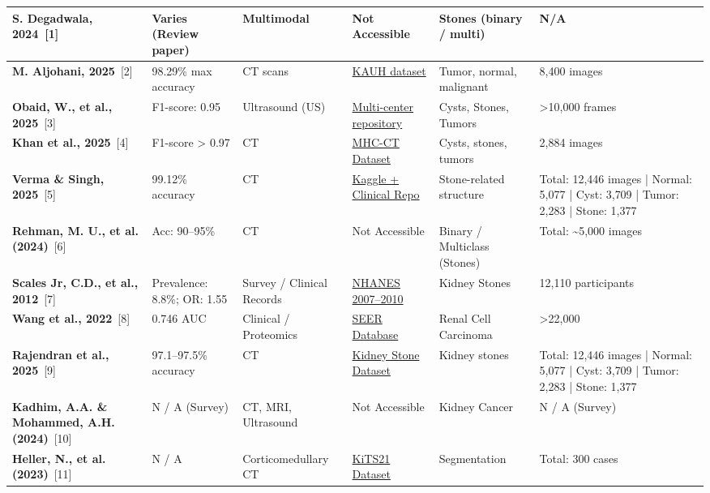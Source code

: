 \documentclass{article}
\begin{document}
\begin{longtable}{|L{2.8cm}|L{2.5cm}|L{1.5cm}|L{3.5cm}|L{3.5cm}|L{4.5cm}|}
\textbf{S. Degadwala, 2024}~[1] & Varies (Review paper) & Multimodal & Not Accessible & Stones (binary / multi) & N/A \\
\hline
\textbf{M. Aljohani, 2025}~[2] & 98.29\% max accuracy & CT scans & \href{https://github.com/DaliaAlzubi/KidneyTumor}{KAUH dataset} & Tumor, normal, malignant & 8,400 images \\
\hline
\textbf{Obaid, W., et al., 2025}~[3] & F1-score: 0.95 & Ultrasound (US) & \href{https://universe.roboflow.com/proyecto-1/tesis-iz9ji}{Multi-center repository} & Cysts, Stones, Tumors & >10,000 frames \\
\hline
\textbf{Khan et al., 2025}~[4] & F1-score > 0.97 & CT & \href{https://www.kaggle.com/datasets/nazmul0087/ct-kidney-dataset-normal-cyst-tumor-and-stone}{MHC-CT Dataset} & Cysts, stones, tumors & 2,884 images \\
\hline
\textbf{Verma \& Singh, 2025}~[5] & 99.12\% accuracy & CT & \href{https://github.com/VS-EYE/KidneyDiseaseDetection}{Kaggle + Clinical Repo} & Stone-related structure & Total: 12,446 images | Normal: 5,077 | Cyst: 3,709 | Tumor: 2,283 | Stone: 1,377 \\
\hline
\textbf{Rehman, M. U., et al. (2024)}~[6] & Acc: 90–95\% & CT & Not Accessible & Binary / Multiclass (Stones) & Total: \textasciitilde{}5,000 images \\
\hline
\textbf{Scales Jr, C.D., et al., 2012}~[7] & Prevalence: 8.8\%; OR: 1.55 & Survey / Clinical Records & \href{https://www.cdc.gov/nchs/nhanes/index.htm}{NHANES 2007–2010} & Kidney Stones & 12,110 participants \\
\hline
\textbf{Wang et al., 2022}~[8] & 0.746 AUC & Clinical / Proteomics & \href{https://seer.cancer.gov/}{SEER Database} & Renal Cell Carcinoma & >22,000 \\
\hline
\textbf{Rajendran et al., 2025}~[9] & 97.1–97.5\% accuracy & CT & \href{https://www.kaggle.com/datasets/nazmul0087/ct-kidney-dataset-normal-cyst-tumor-and-stone}{Kidney Stone Dataset} & Kidney stones & Total: 12,446 images | Normal: 5,077 | Cyst: 3,709 | Tumor: 2,283 | Stone: 1,377 \\
\hline
\textbf{Kadhim, A.A. \& Mohammed, A.H. (2024)}~[10] & N / A (Survey) & CT, MRI, Ultrasound & Not Accessible & Kidney Cancer & N / A (Survey) \\
\hline
\textbf{Heller, N., et al. (2023)}~[11] & N / A & Corticomedullary CT & \href{https://github.com/neheller/kits21/tree/master/kits21/data}{KiTS21 Dataset} & Segmentation & Total: 300 cases \\

\end{longtable}
\end{document}
